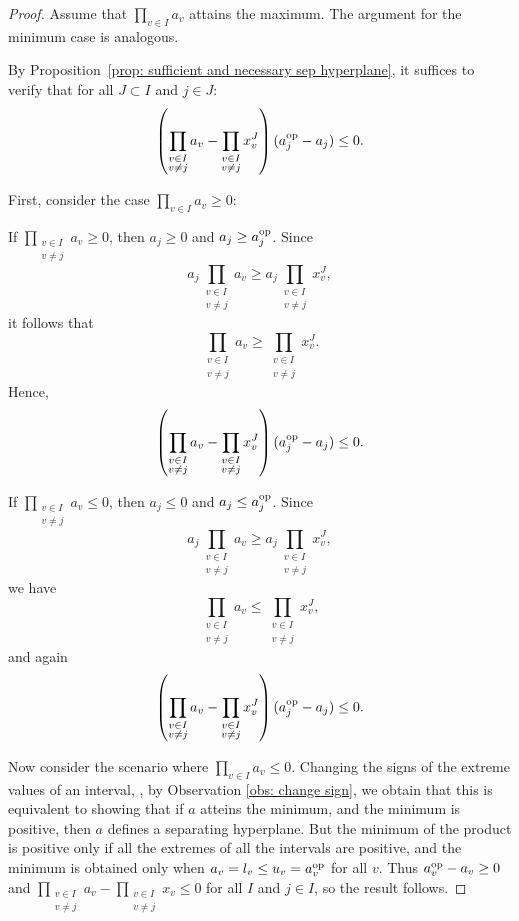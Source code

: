 \documentclass{article}
\begin{document}
	\begin{proof}
	Assume that \(\prod_{v \in I}a_v\) attains the maximum. The argument for the minimum case is analogous.
	
	By Proposition~\ref{prop: sufficient and necessary sep hyperplane}, it suffices to verify that for all \(J \subset I\) and \(j \in J\):
	\[
	\left(\prod_{\substack{v \in I \\ v \neq j}}a_v - \prod_{\substack{v \in I \\ v \neq j}}x^{J}_v\right)(a^{\text{op}}_j - a_j) \leq 0.
	\]
	
	First, consider the case \(\prod_{v \in I}a_v \geq 0\):
	
	\item If \(\prod_{\substack{v \in I \\ v \neq j}}a_v \geq 0\), then \(a_j \geq 0\) and \(a_j \geq a^{\text{op}}_j\). Since 
	\[
	a_j\prod_{\substack{v \in I \\ v \neq j}}a_v \geq a_j\prod_{\substack{v \in I \\ v \neq j}}x^{J}_v,
	\]
	it follows that 
	\[
	\prod_{\substack{v \in I \\ v \neq j}}a_v \geq \prod_{\substack{v \in I \\ v \neq j}}x^{J}_v.
	\]
	Hence,
	\[
	\left(\prod_{\substack{v \in I \\ v \neq j}}a_v - \prod_{\substack{v \in I \\ v \neq j}}x^{J}_v\right)(a^{\text{op}}_j - a_j) \leq 0.
	\]
	
	 If \(\prod_{\substack{v \in I \\ v \neq j}}a_v \leq 0\), then \(a_j \leq 0\) and \(a_j \leq a^{\text{op}}_j\). Since
	\[
	a_j\prod_{\substack{v \in I \\ v \neq j}}a_v \geq a_j\prod_{\substack{v \in I \\ v \neq j}}x^{J}_v,
	\]
	we have
	\[
	\prod_{\substack{v \in I \\ v \neq j}}a_v \leq \prod_{\substack{v \in I \\ v \neq j}}x^{J}_v,
	\]
	and again
	\[
	\left(\prod_{\substack{v \in I \\ v \neq j}}a_v - \prod_{\substack{v \in I \\ v \neq j}}x^{J}_v\right)(a^{\text{op}}_j - a_j) \leq 0.
	\]

	
	Now consider the scenario where \(\prod_{v \in I}a_v \leq 0\). Changing the signs of the extreme values of an interval, , by Observation \ref{obs: change sign}, we obtain that this is equivalent to showing that if \(a\) atteins the minimum, and the minimum is positive, then \(a\) defines a separating hyperplane.
	But the minimum of the product is positive only if all the extremes of all the intervals are positive, and the minimum is obtained only when \(a_v = l_v \leq u_v = a^{\text{op}}_v\) for all \(v\). Thus \(a^{\text{op}}_v - a_v \geq 0\) and \(\prod_{\substack{v \in I \\ v \neq j}}a_v - \prod_{\substack{v \in I \\ v \neq j}} x_v\leq 0 \) for all \(I\) and \(j \in I\), so the result follows. 


\end{proof}
\end{document}
